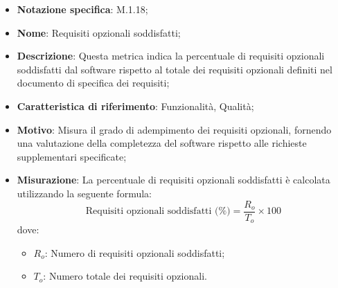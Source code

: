 \begin{itemize}
    \item \textbf{Notazione specifica}: M.1.18;
    \item \textbf{Nome}: Requisiti opzionali soddisfatti;
    \item \textbf{Descrizione}: Questa metrica indica la percentuale di requisiti opzionali soddisfatti dal software rispetto al totale dei requisiti opzionali definiti nel documento di specifica dei requisiti;
    \item \textbf{Caratteristica di riferimento}: Funzionalità, Qualità;
    \item \textbf{Motivo}: Misura il grado di adempimento dei requisiti opzionali, fornendo una valutazione della completezza del software rispetto alle richieste supplementari specificate;
    \item \textbf{Misurazione}: La percentuale di requisiti opzionali soddisfatti è calcolata utilizzando la seguente formula:
    \[
    \text{Requisiti opzionali soddisfatti (\%)} = \frac{R_{o}}{T_{o}} \times 100
    \]
    dove:
    \begin{itemize}
        \item $R_{o}$: Numero di requisiti opzionali soddisfatti;
        \item $T_{o}$: Numero totale dei requisiti opzionali.
    \end{itemize}
\end{itemize}
